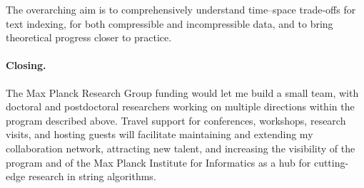 \documentclass[a4paper,11pt]{article}
\begin{document}
The overarching aim is to comprehensively understand time--space trade-offs for text indexing, for both compressible and incompressible data, and to bring theoretical progress closer to practice.

\paragraph*{Closing.}

The Max Planck Research Group funding would let me build a small team, with doctoral and postdoctoral researchers working on multiple directions within the program described above. 
Travel support for conferences, workshops, research visits, and hosting guests will facilitate maintaining and extending my collaboration network, attracting new talent, and increasing the visibility of the program and of the Max Planck Institute for Informatics as a hub for cutting-edge research in string algorithms.

\singlespacing 
\let\oldthebibliography\thebibliography
\let\endoldthebibliography\endthebibliography
\renewenvironment{thebibliography}[1]{\small
  \begin{oldthebibliography}{#1}
    \setlength{\itemsep}{0em}
    \setlength{\parskip}{0em}
}
{
  \end{oldthebibliography}
}

{ 

 
}
\end{document}
